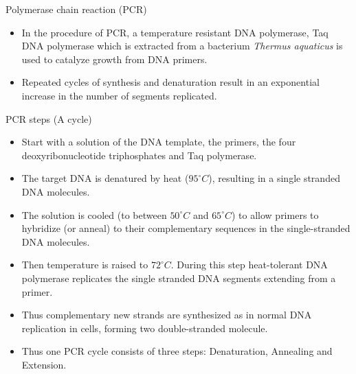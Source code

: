 \documentclass[11pt,dvipsnames,ignorenonframetext,aspectratio=169]{beamer}
\providecommand{\tightlist}{%
  \setlength{\itemsep}{0pt}\setlength{\parskip}{0pt}}
\begin{document}
\begin{frame}{Polymerase chain reaction (PCR)}
\protect\hypertarget{polymerase-chain-reaction-pcr}{}
\begin{itemize}
\tightlist
\item
  In the procedure of PCR, a temperature resistant DNA polymerase, Taq
  DNA polymerase which is extracted from a bacterium \emph{Thermus
  aquaticus} is used to catalyze growth from DNA primers.
\item
  Repeated cycles of synthesis and denaturation result in an exponential
  increase in the number of segments replicated.
\end{itemize}
\end{frame}

\begin{frame}{PCR steps (A cycle)}
\protect\hypertarget{pcr-steps-a-cycle}{}
\begin{itemize}
\tightlist
\item
  Start with a solution of the DNA template, the primers, the four
  deoxyribonucleotide triphosphates and Taq polymerase.
\item
  The target DNA is denatured by heat (\(95^\circ C\)), resulting in a
  single stranded DNA molecules.
\item
  The solution is cooled (to between \(50^\circ C\) and \(65^\circ C\))
  to allow primers to hybridize (or anneal) to their complementary
  sequences in the single-stranded DNA molecules.
\item
  Then temperature is raised to \(72^\circ C\). During this step
  heat-tolerant DNA polymerase replicates the single stranded DNA
  segments extending from a primer.
\item
  Thus complementary new strands are synthesized as in normal DNA
  replication in cells, forming two double-stranded molecule.
\item
  Thus one PCR cycle consists of three steps: Denaturation, Annealing
  and Extension.
\end{itemize}
\end{frame}
\end{document}

